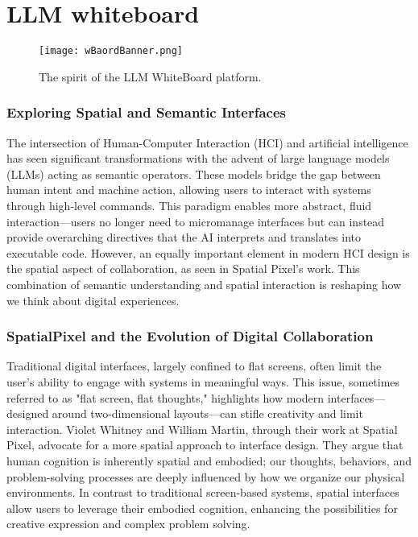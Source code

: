 \section{LLM whiteboard}



\begin{figure}[h]
    \centering
    \texttt{[image: wBaordBanner.png]}
    \caption{The spirit of the LLM WhiteBoard platform.}
    \vspace{0.1cm}
    \label{fig:spiritofWB}
\end{figure}


\subsubsection{Exploring Spatial and Semantic Interfaces}
The intersection of Human-Computer Interaction (HCI) and artificial intelligence has seen significant transformations with the advent of large language models (LLMs) acting as semantic operators.
These models bridge the gap between human intent and machine action, allowing users to interact with systems through high-level commands.
This paradigm enables more abstract, fluid interaction—users no longer need to micromanage interfaces but can instead provide overarching directives that the AI interprets and translates into executable code.
However, an equally important element in modern HCI design is the spatial aspect of collaboration, as seen in Spatial Pixel's work.
This combination of semantic understanding and spatial interaction is reshaping how we think about digital experiences.

\subsubsection{SpatialPixel and the Evolution of Digital Collaboration}
Traditional digital interfaces, largely confined to flat screens, often limit the user’s ability to engage with systems in meaningful ways.
This issue, sometimes referred to as "flat screen, flat thoughts,"\cite{whitney2024} highlights how modern interfaces—designed around two-dimensional layouts—can stifle creativity and limit interaction.
Violet Whitney and William Martin, through their work at Spatial Pixel, advocate for a more spatial approach to interface design.
They argue that human cognition is inherently spatial and embodied; our thoughts, behaviors, and problem-solving processes are deeply influenced by how we organize our physical environments.
In contrast to traditional screen-based systems, spatial interfaces allow users to leverage their embodied cognition, enhancing the possibilities for creative expression and complex problem solving.

